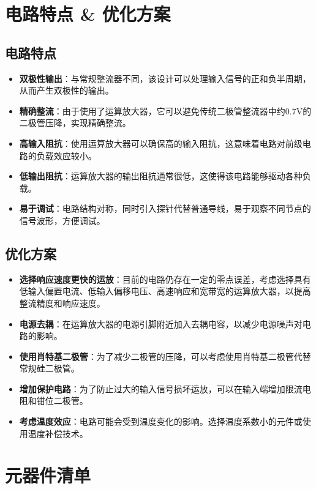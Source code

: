 \documentclass[UTF8,titlepage,a4paper]{ctexart}
\numberwithin{figure}{section}
\begin{document}
\section{电路特点 \& 优化方案}

\subsection{电路特点}
\begin{itemize}
    \item \textbf{双极性输出}：与常规整流器不同，该设计可以处理输入信号的正和负半周期，从而产生双极性的输出。
    \item \textbf{精确整流}：由于使用了运算放大器，它可以避免传统二极管整流器中约0.7V的二极管压降，实现精确整流。
    \item \textbf{高输入阻抗}：使用运算放大器可以确保高的输入阻抗，这意味着电路对前级电路的负载效应较小。
    \item \textbf{低输出阻抗}：运算放大器的输出阻抗通常很低，这使得该电路能够驱动各种负载。
    \item \textbf{易于调试}：电路结构对称，同时引入探针代替普通导线，易于观察不同节点的信号波形，方便调试。
\end{itemize}
\subsection{优化方案}
\begin{itemize}
    \item \textbf{选择响应速度更快的运放}：目前的电路仍存在一定的零点误差，考虑选择具有低输入偏置电流、低输入偏移电压、高速响应和宽带宽的运算放大器，以提高整流精度和响应速度。
    \item \textbf{电源去耦}：在运算放大器的电源引脚附近加入去耦电容，以减少电源噪声对电路的影响。
    \item \textbf{使用肖特基二极管}：为了减少二极管的压降，可以考虑使用肖特基二极管代替常规硅二极管。
    \item \textbf{增加保护电路}：为了防止过大的输入信号损坏运放，可以在输入端增加限流电阻和钳位二极管。
    \item \textbf{考虑温度效应}：电路可能会受到温度变化的影响。选择温度系数小的元件或使用温度补偿技术。
\end{itemize}
\clearpage
\section{元器件清单}
\end{document}
